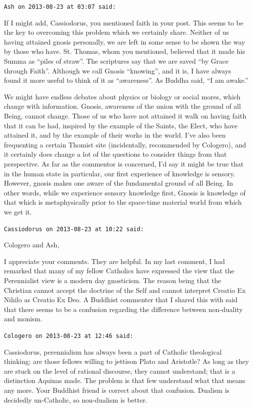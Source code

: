\begin{footnotesize}
\begin{sffamily}
\hfill

\texttt{Ash on 2013-08-23 at 03:07 said:}

If I might add, Cassiodorus, you mentioned faith in your post. This seems to be the key to overcoming this problem which we certainly share. Neither of us having attained gnosis personally, we are left in some sense to be shown the way by those who have. St. Thomas, whom you mentioned, believed that it made his Summa as ``piles of straw''. The scriptures say that we are saved ``by Grace through Faith''. Although we call Gnosis ``knowing'', and it is, I have always found it more useful to think of it as ``awareness''. As Buddha said, ``I am awake.''

We might have endless debates about physics or biology or social mores, which change with information. Gnosis, awareness of the union with the ground of all Being, cannot change. Those of us who have not attained it walk on having faith that it can be had, inspired by the example of the Saints, the Elect, who have attained it, and by the example of their works in the world. I've also been frequenting a certain Thomist site (incidentally, recommended by Cologero), and it certainly does change a lot of the questions to consider things from that perspective. As far as the commentor is concerned, I'd say it might be true that in the human state in particular, our first experience of knowledge is sensory. However, gnosis makes one aware of the fundamental ground of all Being. In other words, while we experience sensory knowledge first, Gnosis is knowledge of that which is metaphysically prior to the space-time material world from which we get it.

\hfill

\texttt{Cassiodorus on 2013-08-23 at 10:22 said:}

Cologero and Ash,

I appreciate your comments. They are helpful. In my last comment, I had remarked that many of my fellow Catholics have expressed the view that the Perennialist view is a modern day gnosticism. The reason being that the Christian cannot accept the doctrine of the Self and cannot interpret Creatio Ex Nihilo as Creatio Ex Deo. A Buddhist commenter that I shared this with said that there seems to be a confusion regarding the difference between non-duality and monism.

\hfill

\texttt{Cologero on 2013-08-23 at 12:46 said:}

Cassiodorus, perennialism has always been a part of Catholic theological thinking; are those fellows willing to jettison Plato and Aristotle? As long as they are stuck on the level of rational discourse, they cannot understand; that is a distinction Aquinas made. The problem is that few understand what that means any more. Your Buddhist friend is correct about that confusion. Dualism is decidedly un-Catholic, so non-dualism is better.


\end{sffamily}
\end{footnotesize}
